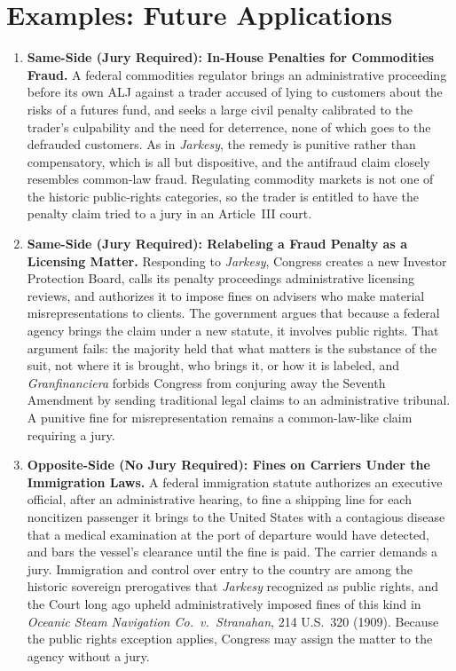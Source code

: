 \documentclass[12pt]{article}
\begin{document}
\section{Examples: Future Applications}
\begin{enumerate}

\item \textbf{Same-Side (Jury Required): In-House Penalties for Commodities Fraud.} A federal commodities regulator brings an administrative proceeding before its own ALJ against a trader accused of lying to customers about the risks of a futures fund, and seeks a large civil penalty calibrated to the trader's culpability and the need for deterrence, none of which goes to the defrauded customers. As in \textit{Jarkesy}, the remedy is punitive rather than compensatory, which is all but dispositive, and the antifraud claim closely resembles common-law fraud. Regulating commodity markets is not one of the historic public-rights categories, so the trader is entitled to have the penalty claim tried to a jury in an Article~III court.

\item \textbf{Same-Side (Jury Required): Relabeling a Fraud Penalty as a Licensing Matter.} Responding to \textit{Jarkesy}, Congress creates a new Investor Protection Board, calls its penalty proceedings administrative licensing reviews, and authorizes it to impose fines on advisers who make material misrepresentations to clients. The government argues that because a federal agency brings the claim under a new statute, it involves public rights. That argument fails: the majority held that what matters is the substance of the suit, not where it is brought, who brings it, or how it is labeled, and \textit{Granfinanciera} forbids Congress from conjuring away the Seventh Amendment by sending traditional legal claims to an administrative tribunal. A punitive fine for misrepresentation remains a common-law-like claim requiring a jury.

\item \textbf{Opposite-Side (No Jury Required): Fines on Carriers Under the Immigration Laws.} A federal immigration statute authorizes an executive official, after an administrative hearing, to fine a shipping line for each noncitizen passenger it brings to the United States with a contagious disease that a medical examination at the port of departure would have detected, and bars the vessel's clearance until the fine is paid. The carrier demands a jury. Immigration and control over entry to the country are among the historic sovereign prerogatives that \textit{Jarkesy} recognized as public rights, and the Court long ago upheld administratively imposed fines of this kind in \textit{Oceanic Steam Navigation Co.\ v.\ Stranahan}, 214 U.S.\ 320 (1909). Because the public rights exception applies, Congress may assign the matter to the agency without a jury.


\end{enumerate}
\end{document}
